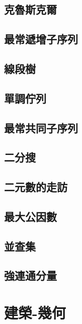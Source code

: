 \subsection{克魯斯克爾}
\raggedbottom
\hrulefill
\subsection{最常遞增子序列}
\raggedbottom
\hrulefill
\subsection{線段樹}
\raggedbottom
\hrulefill
\subsection{單調佇列}
\raggedbottom
\hrulefill
\subsection{最常共同子序列}
\raggedbottom
\hrulefill
\subsection{二分搜}
\raggedbottom
\hrulefill
\subsection{二元數的走訪}
\raggedbottom
\hrulefill
\subsection{最大公因數}
\raggedbottom
\hrulefill
\subsection{並查集}
\raggedbottom
\hrulefill
\subsection{強連通分量}
\raggedbottom
\hrulefill

\section{建榮-幾何}
